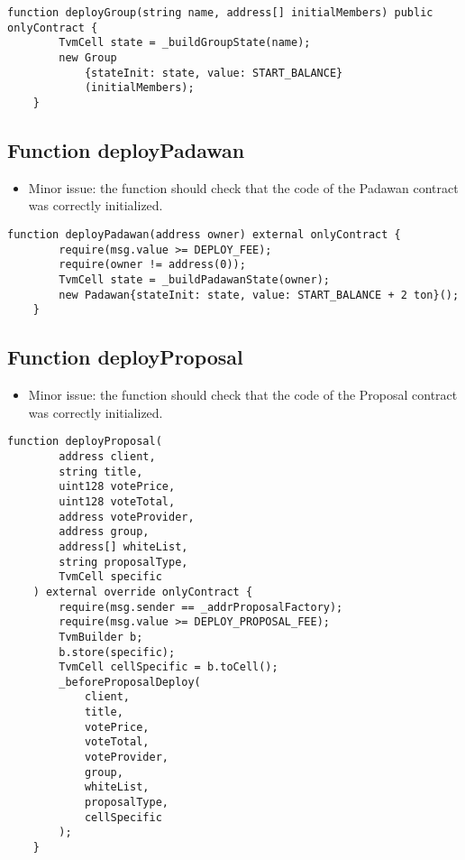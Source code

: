 \begin{lstlisting}[firstnumber=221]
    function deployGroup(string name, address[] initialMembers) public onlyContract {
        TvmCell state = _buildGroupState(name);
        new Group
            {stateInit: state, value: START_BALANCE}
            (initialMembers);
    }
\end{lstlisting}

\subsection{Function deployPadawan}

\begin{itemize}
\item Minor issue: the function should check that the code of the
  Padawan contract was correctly initialized.
\end{itemize}

\begin{lstlisting}[firstnumber=134]
    function deployPadawan(address owner) external onlyContract {
        require(msg.value >= DEPLOY_FEE);
        require(owner != address(0));
        TvmCell state = _buildPadawanState(owner);
        new Padawan{stateInit: state, value: START_BALANCE + 2 ton}();
    }
\end{lstlisting}

\subsection{Function deployProposal}

\begin{itemize}
\item Minor issue: the function should check that the code of the
  Proposal contract was correctly initialized.
\end{itemize}

\begin{lstlisting}[firstnumber=143]
    function deployProposal(
        address client,
        string title,
        uint128 votePrice,
        uint128 voteTotal,
        address voteProvider,
        address group,
        address[] whiteList,
        string proposalType,
        TvmCell specific
    ) external override onlyContract {
        require(msg.sender == _addrProposalFactory);
        require(msg.value >= DEPLOY_PROPOSAL_FEE);
        TvmBuilder b;
        b.store(specific);
        TvmCell cellSpecific = b.toCell();
        _beforeProposalDeploy(
            client,
            title,
            votePrice,
            voteTotal,
            voteProvider,
            group,
            whiteList,
            proposalType,
            cellSpecific
        );
    }
\end{lstlisting}

